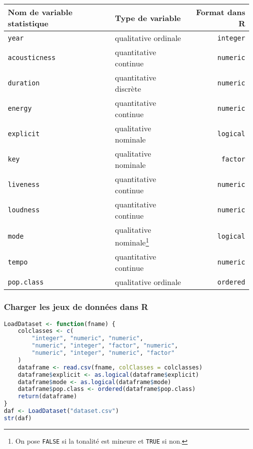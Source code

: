 \documentclass[
  11pt,
  xcolor = usenames,dvipsnames]{article}
\newcommand{\passthrough}[1]{#1}
\begin{document}
\begin{longtable}[]{@{}llr@{}}
\toprule
Nom de variable statistique & Type de variable & Format dans R \\
\midrule
\endhead
\passthrough{\lstinline!year!} & qualitative ordinale & \passthrough{\lstinline!integer!} \\
\passthrough{\lstinline!acousticness!} & quantitative continue & \passthrough{\lstinline!numeric!} \\
\passthrough{\lstinline!duration!} & quantitative discrète & \passthrough{\lstinline!numeric!} \\
\passthrough{\lstinline!energy!} & quantitative continue & \passthrough{\lstinline!numeric!} \\
\passthrough{\lstinline!explicit!} & qualitative nominale & \passthrough{\lstinline!logical!} \\
\passthrough{\lstinline!key!} & qualitative nominale & \passthrough{\lstinline!factor!} \\
\passthrough{\lstinline!liveness!} & quantitative continue & \passthrough{\lstinline!numeric!} \\
\passthrough{\lstinline!loudness!} & quantitative continue & \passthrough{\lstinline!numeric!} \\
\passthrough{\lstinline!mode!} & qualitative nominale\footnote{On pose \passthrough{\lstinline!FALSE!} si la tonalité est mineure et \passthrough{\lstinline!TRUE!} si non.} & \passthrough{\lstinline!logical!} \\
\passthrough{\lstinline!tempo!} & quantitative continue & \passthrough{\lstinline!numeric!} \\
\passthrough{\lstinline!pop.class!} & qualitative ordinale & \passthrough{\lstinline!ordered!} \\
\bottomrule
\end{longtable}

\hypertarget{charger-les-jeux-de-donnuxe9es-dans-r}{%
\subsubsection{Charger les jeux de données dans R}\label{charger-les-jeux-de-donnuxe9es-dans-r}}

\begin{lstlisting}[language=R]
LoadDataset <- function(fname) {
    colclasses <- c(
        "integer", "numeric", "numeric",
        "numeric", "integer", "factor", "numeric",
        "numeric", "integer", "numeric", "factor"
    )
    dataframe <- read.csv(fname, colClasses = colclasses)
    dataframe$explicit <- as.logical(dataframe$explicit)
    dataframe$mode <- as.logical(dataframe$mode)
    dataframe$pop.class <- ordered(dataframe$pop.class)
    return(dataframe)
}
daf <- LoadDataset("dataset.csv")
str(daf)
\end{lstlisting}
\end{document}
